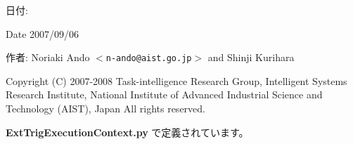 \begin{Desc}
\item[日付:]\end{Desc}
\begin{Desc}
\item[Date]2007/09/06\end{Desc}
\begin{Desc}
\item[作者:]Noriaki Ando $<${\tt n-ando@aist.go.jp}$>$ and Shinji Kurihara\end{Desc}
Copyright (C) 2007-2008 Task-intelligence Research Group, Intelligent Systems Research Institute, National Institute of Advanced Industrial Science and Technology (AIST), Japan All rights reserved. 

 {\bf ExtTrigExecutionContext.py} で定義されています。